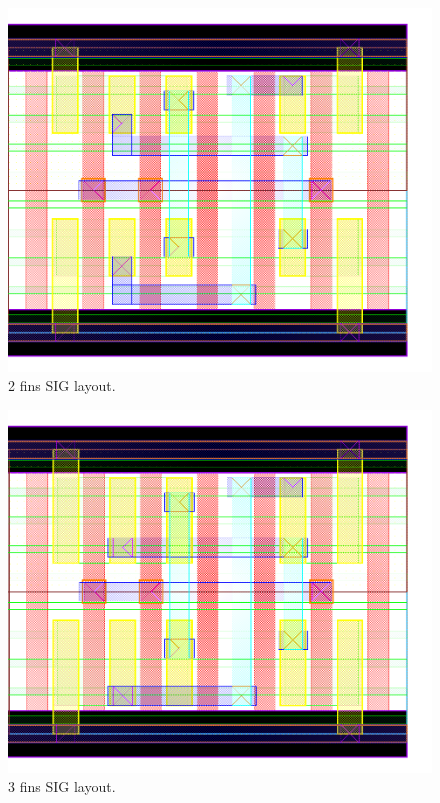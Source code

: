 \documentclass[pgmicro,mestrado,english]{iiufrgs}
\begin{document}
\begin{figure}[]
\centering
\includegraphics[width=\textwidth,height=\textheight,keepaspectratio]{SIG2F.png}
\caption{2 fins SIG layout.}
\label{fig:SIG2F}
\end{figure}

\begin{figure}[]
\centering
\includegraphics[width=\textwidth,height=\textheight,keepaspectratio]{SIG3F.png}
\caption{3 fins SIG layout.}
\label{fig:SIG3F}
\end{figure}
\end{document}
